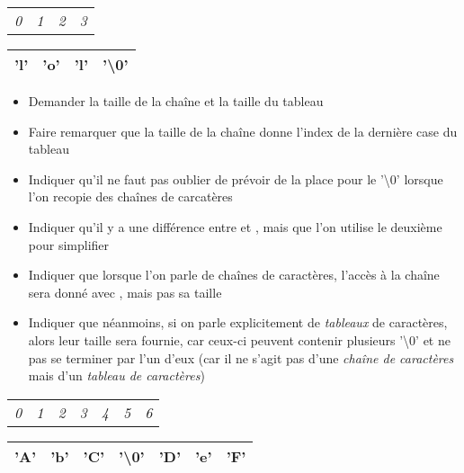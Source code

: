 \documentclass[11pt,a4paper]{article}
\begin{document}
\begin{table}[h!]
  \centering
  \begin{tabular}{ C{0.7cm} C{0.7cm} C{0.7cm} C{0.7cm} }
\textit{0} & \textit{1} & \textit{2} & \textit{3} \\
  \end{tabular}

  \begin{tabular}{| C{0.7cm} | C{0.7cm} | C{0.7cm} | C{0.7cm} |}
  \hline
'l' & 'o' & 'l' & '\textbackslash 0' \\
  \hline
  \end{tabular}
\end{table}


\begin{itemize}
\item Demander la taille de la chaîne et la taille du tableau
\item Faire remarquer que la taille de la chaîne donne l'index de la dernière case du tableau
\item Indiquer qu'il ne faut pas oublier de prévoir de la place pour le '\textbackslash 0' lorsque l'on recopie des chaînes de carcatères
\end{itemize}

\bigskip

\begin{itemize}
\item Indiquer qu'il y a une différence entre  et , mais que l'on utilise le deuxième pour simplifier
\item Indiquer que lorsque l'on parle de chaînes de caractères, l'accès à la chaîne sera donné avec , mais pas sa taille
\item Indiquer que néanmoins, si on parle explicitement de \textit{tableaux} de caractères, alors leur taille sera fournie, car ceux-ci peuvent contenir plusieurs '\textbackslash 0' et ne pas se terminer par l'un d'eux (car il ne s'agit pas d'une \textit{chaîne de caractères} mais d'un \textit{tableau de caractères})
\end{itemize}

\bigskip


\begin{table}[h!]
  \centering
  \begin{tabular}{ C{0.7cm} C{0.7cm} C{0.7cm} C{0.7cm} C{0.7cm} C{0.7cm} C{0.7cm} }
\textit{0} & \textit{1} & \textit{2} & \textit{3} & \textit{4} & \textit{5} & \textit{6} \\
  \end{tabular}

  \begin{tabular}{| C{0.7cm} | C{0.7cm} | C{0.7cm} | C{0.7cm} | C{0.7cm} | C{0.7cm} | C{0.7cm} |}
  \hline
'A' & 'b' & 'C' & '\textbackslash 0' & 'D' & 'e' & 'F' \\
  \hline
  \end{tabular}
\end{table}
\end{document}
